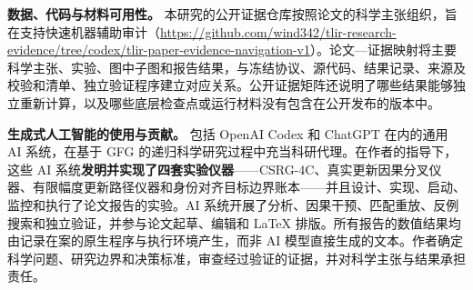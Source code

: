 \noindent\textbf{数据、代码与材料可用性。}
本研究的公开证据仓库按照论文的科学主张组织，旨在支持快速机器辅助审计（\url{https://github.com/wind342/tlir-research-evidence/tree/codex/tlir-paper-evidence-navigation-v1}）。论文—证据映射将主要科学主张、实验、图中子图和报告结果，与冻结协议、源代码、结果记录、来源及校验和清单、独立验证程序建立对应关系。公开证据矩阵还说明了哪些结果能够独立重新计算，以及哪些底层检查点或运行材料没有包含在公开发布的版本中。

\noindent\textbf{生成式人工智能的使用与贡献。}
包括 OpenAI Codex 和 ChatGPT 在内的通用 AI 系统，在基于 GFG 的递归科学研究过程中充当科研代理。在作者的指导下，这些 AI 系统\textbf{发明并实现了四套实验仪器}——CSRG-4C、真实更新因果分叉仪器、有限幅度更新路径仪器和身份对齐目标边界账本——并且设计、实现、启动、监控和执行了论文报告的实验。AI 系统开展了分析、因果干预、匹配重放、反例搜索和独立验证，并参与论文起草、编辑和 LaTeX 排版。所有报告的数值结果均由记录在案的原生程序与执行环境产生，而非 AI 模型直接生成的文本。作者确定科学问题、研究边界和决策标准，审查经过验证的证据，并对科学主张与结果承担责任。

